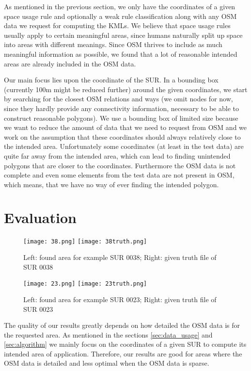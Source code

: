 \documentclass[11pt,fleqn]{book} %
\newcommand{\todol}{\todo[inline]} %
\begin{document}
As mentioned in the previous section, we only have the coordinates of a given space usage rule and optionally a weak rule classification along with any OSM data we request for computing the KMLs. We believe that space usage rules usually apply to certain meaningful areas, since humans naturally split up space into areas with different meanings. Since OSM thrives to include as much meaningful information as possible, we found that a lot of reasonable intended areas are already included in the OSM data. 

Our main focus lies upon the coordinate of the SUR. In a bounding box (currently 100m might be reduced further) around the given coordinates, we start by searching for the closest OSM relations and ways (we omit nodes for now, since they hardly provide any connectivity information, necessary to be able to construct reasonable polygons). We use a bounding box of limited size because we want to reduce the amount of data that we need to request from OSM and we work on the assumption that these coordinates should always relatively close to the intended area. Unfortunately some coordinates (at least in the test data) are quite far away from the intended area, which can lead to finding unintended polygons that are closer to the coordinates. Furthermore the OSM data is not complete and even some elements from the test data are not present in OSM, which means, that we have no way of ever finding the intended polygon.

\section{Evaluation}\label{sec:evaluation}
\begin{figure}[h]
\texttt{[image: 38.png]}
\texttt{[image: 38truth.png]}
\caption{Left: found area for example SUR 0038; Right: given truth file of SUR 0038}
\label{fic:38}
\end{figure}
\begin{figure}
\texttt{[image: 23.png]}
\texttt{[image: 23truth.png]}
\caption{Left: found area for example SUR 0023; Right: given truth file of SUR 0023}
\label{fic:23}
\end{figure}

The quality of our results greatly depends on how detailed the OSM data is for the requested area. As mentioned in the sections \ref{sec:data_usage} and \ref{sec:algorithm} we mainly focus on the coordinates of a given SUR to compute its intended area of application. Therefore, our results are good for areas where the OSM data is detailed and less optimal when the OSM data is sparse. 
\end{document}
